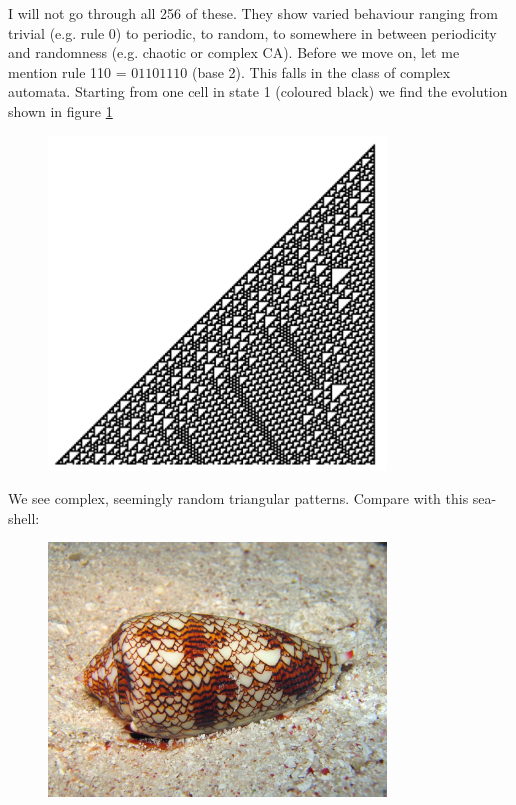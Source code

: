\documentclass[12pt]{article}
\numberwithin{equation}{section}
\begin{document}
I will not go through all 256 of these. They show varied behaviour ranging from trivial (e.g. rule 0) to periodic, to random, to somewhere in between periodicity and randomness (e.g. chaotic or complex CA). Before we move on, let me mention rule 110 = \(01101110\) (base 2). This falls in the class of complex automata. Starting from one cell in state 1 (coloured black) we find the evolution shown in figure \ref{rule110}
\begin{figure}[H]
\centering
\includegraphics[width=0.8\textwidth]{rule110.png}
\caption{}
\label{rule110}
\end{figure}    
We see complex, seemingly random triangular patterns. Compare with this sea-shell:
\begin{figure}[H]
\centering
\includegraphics[width=0.8\textwidth]{Seashell.jpg}
\caption{}
\label{Seashell}
\end{figure}    
\end{document}
